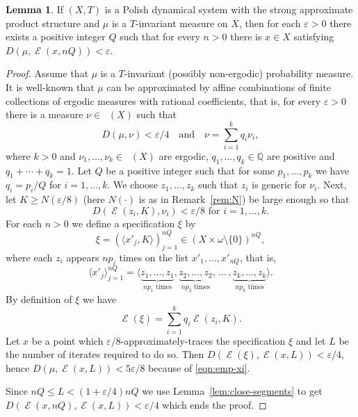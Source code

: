 \documentclass{amsart}
\theoremstyle{definition}
\newtheorem{lem}[thm]{Lemma}
\DeclareMathOperator{\Emp}{\mathcal{E}}%
\DeclareMathOperator{\MT}{\mathcal{M}_{\mathit T} }
\newcommand{\eps}{\varepsilon}
\newcommand{\N}{\mathbb{N}}
\begin{document}
\begin{lem}\label{lem:protogen}
If $(X,T)$ is a Polish dynamical system with the strong approximate
product structure and $\mu$ is a $T$-invariant measure on $X$, then
for each $\eps>0$ there exists a positive integer $Q$ such that for every $n>0$
there is $x\in X$ satisfying $D(\mu,\Emp(x,nQ))<\eps$.
\end{lem}



\begin{proof} Assume that $\mu$ is a $T$-invariant (possibly non-ergodic) probability measure.
It is well-known that $\mu$ can be approximated by  affine combinations of finite collections of
ergodic measures with rational coefficients, that is, for every $\eps>0$ there is a measure $\nu\in\MT(X)$ such that
\[
D(\mu,\nu)<\eps/4\quad \text{and}\quad\nu=\sum_{i=1}^{k} q_i \nu_i,
\]
where $k>0$ and $\nu_1,\ldots,\nu_k\in\MT(X)$ are ergodic, $q_1,\ldots,q_k\in\mathbb{Q}$ are positive
and $q_1+\cdots+q_k=1$. Let $Q$ be a positive integer such that for some $p_1,\ldots,p_k$ we have $q_i=p_i/Q$ for $i=1,\ldots,k$.
We choose $z_1,\ldots,z_k$ such that $z_i$ is generic for $\nu_i$.
Next, let $K\geq N(\eps/8)$ (here $N(\cdot)$ is as in Remark~\ref{rem:N}) be large enough so that
\[
D(\Emp(z_i,K),\nu_i)<\eps/8 \text{ for }i=1,\ldots,k.
\]
For each $n>0$ we define a specification $\xi$ by
\[
\xi=(\langle x'_j,K\rangle)_{j=1}^{nQ}\in (X\times \omega\setminus\{0\})^{nQ},
\]
where each $z_i$ appears $np_i$ times on the list $x'_1,\ldots,x'_{nQ}$, that is,
\[
\langle x'_j\rangle_{j=1}^{nQ}=\langle \underbrace{z_1,\ldots,z_1}_{\text{$np_1$ times}},
\underbrace{z_2,\ldots,z_2}_{\text{$np_2$ times}},\,\ldots\,,\underbrace{z_k,\ldots,z_k}_{\text{$np_k$ times}}\rangle.
\]
By definition of $\xi$ we have
\begin{equation}\label{eqn:emp-xi}
\Emp(\xi)=\sum_{i=1}^k q_i\Emp(z_i,K) .
\end{equation}
Let $x$ be a point which $\eps/8$-approximately-traces the specification $\xi$ and let $L$ be
the number of iterates required to do so. Then
$D(\Emp(\xi),\Emp(x,L))<\eps/4$, hence $D(\mu,\Emp(x,L))<5\eps/8$
because of \eqref{eqn:emp-xi}.

Since $nQ\le L<(1+\eps/4)nQ$ we use Lemma~\ref{lem:close-segments} to get
$D(\Emp(x,nQ),\Emp(x,L))<\eps/4$ which ends the proof.
\end{proof}
\end{document}
